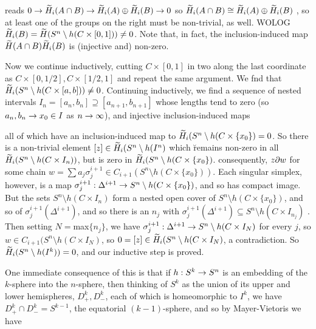 \ssk


\ssk  reads $0\rightarrow \widetilde{H}_i(A\cap B) \rightarrow \widetilde{H}_i(A)\oplus \widetilde{H}_i(B) \rightarrow 0$ so 
$\widetilde{H}_i(A\cap B) \cong \widetilde{H}_i(A)\oplus \widetilde{H}_i(B)$ , so at least one of the groups
on the right must be non-trivial, as well. WOLOG $\widetilde{H}_i(B)=\widetilde{H}(S^n\setminus h(C\times [0,1]))\neq 0$.
Note that, in fact, the inclusion-induced map $\widetilde{H}(A\cap B) \widetilde{H}_i(B)$ is (injective and)
non-zero.

\ssk

Now we continue inductively, cutting $C\times [0,1]$ in two along the last coordinate as
$C\times [0,1/2],C\times [1/2,1]$ and repeat the same argument. We fnd that
$\widetilde{H}_i(S^n\setminus h(C\times [a,b]))\neq 0$. Continuing inductively, we find a
sequence of nested intervals $I_n=[a_n,b_n]\supseteq [a_{n+1},b_{n+1}]$ 
whose lengths tend to zero (so $a_n,b_n\rightarrow x_0\in I$ as $n\rightarrow\infty$), and injective inclusion-induced maps


all of which have an inclusion-induced map to $\widetilde{H}_i(S^n\setminus h(C\times \{x_0\}) = 0$.
So there is a non-trivial element $[z]\in \widetilde{H}_i(S^n\setminus h(I^n)$ which \u{remains}
non-zero in all $\widetilde{H}_i(S^n\setminus h(C\times I_n))$, but is zero in $\widetilde{H}_i(S^n\setminus h(C\times \{x_0\})$.
consequently, $z\partial w$ for some chain $w=\sum a_j\sigma_j^{i+1}\in C_{i+1}(S^n\setminus h(C\times \{x_0\}))$.
Each singular simplex, however, is a map $\sigma_j^{i+1}:\Delta^{i+1}\rightarrow S^n\setminus h(C\times \{x_0\})$,
and so has compact image. But the sets $S^n\setminus h(C\times I_n)$ form a nested open cover of
$S^n\setminus h(C\times \{x_0\})$, and so of $\sigma_j^{i+1}(\Delta^{i+1})$, and so there is an
$n_j$ with $\sigma_j^{i+1}(\Delta^{i+1})\subseteq S^n\setminus h(C\times I_{n_j})$ .
Then setting $N=$max$\{n_j\}$, we have $\sigma_j^{i+1}:\Delta^{i+1}\rightarrow S^n\setminus h(C\times I_N)$
for every $j$,
so $w\in C_{i+1}(S^n\setminus h(C\times I_N)$, so $0=[z]\in \widetilde{H}_i(S^n\setminus h(C\times I_N)$,
a contradiction. So $\widetilde{H}_i(S^n\setminus h(I^k))=0$, and our inductive step is proved.

\msk

One immediate consequence of this is that if $h:S^k\rightarrow S^n$ is an embedding of the $k$-sphere into the $n$-sphere,
then thinking of $S^k$ as the union of its upper and lower hemispheres, $D^k_+,D^k_-$, each of which is homeomorphic
to $I^k$, we have  $D^k_+\cap D^k_-=S^{k-1}$, the equatorial $(k-1)$-sphere, and so by Mayer-Vietoris we have

